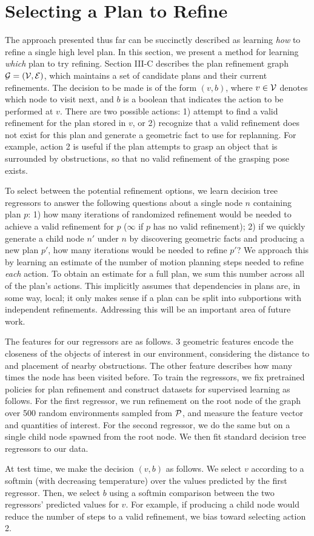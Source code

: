 \section{Selecting a Plan to Refine}
The approach presented thus far can be succinctly described as learning \emph{how} to
refine a single high level plan. In this section, we present a method for learning
\emph{which} plan to try refining. Section III-C describes the plan refinement graph $\mathcal{G} = (\mathcal{V}, \mathcal{E})$,
which maintains a set of candidate plans and their current refinements. The decision to be made is of the form $(v, b)$,
where $v \in \mathcal{V}$ denotes which node to visit next, and $b$ is a boolean that indicates the action
to be performed at $v$. There are two possible actions: 1) attempt to find a valid refinement
for the plan stored in $v$, or 2) recognize that a valid refinement does not exist for this plan
and generate a geometric fact to use for replanning. For example, action 2
is useful if the plan attempts to grasp an object that is surrounded by obstructions,
so that no valid refinement of the grasping pose exists.

To select between the potential refinement options, we learn decision tree regressors
to answer the following questions about a single node $n$ containing plan $p$: 1) how many iterations of randomized refinement
would be needed to achieve a valid refinement for $p$ ($\infty$ if $p$ has no valid refinement); 2)
if we quickly generate a child node $n'$ under $n$ by discovering geometric facts and producing a new plan $p'$,
how many iterations would be needed to refine $p'$? We approach this by learning an estimate of the
number of motion planning steps needed to refine \emph{each} action. To obtain an estimate for a full plan, we
sum this number across all of the plan's actions. This implicitly assumes that dependencies in plans are, in some way, local;
it only makes sense if a plan can be split into subportions with independent refinements.
Addressing this will be an important area of future work.

The features for our regressors are as follows. 3 geometric features encode the closeness of the objects
of interest in our environment, considering the distance to and placement of nearby obstructions. The other
feature describes how many times the node has been visited before. To train the regressors, we fix pretrained
policies for plan refinement and construct datasets for supervised learning as follows.
For the first regressor, we run refinement on the root
node of the graph over 500 random environments sampled from $\mathcal{P}$, and measure the feature vector and quantities of interest.
For the second regressor, we do the same but on a single child node spawned from the root node.
We then fit standard decision tree regressors to our data.

At test time, we make the decision $(v, b)$ as follows. We select $v$ according to a softmin (with decreasing temperature) over the values
predicted by the first regressor. Then, we select $b$ using a softmin comparison between the two regressors'
predicted values for $v$. For example, if producing a child node would reduce the number of steps to a valid refinement,
we bias toward selecting action 2.